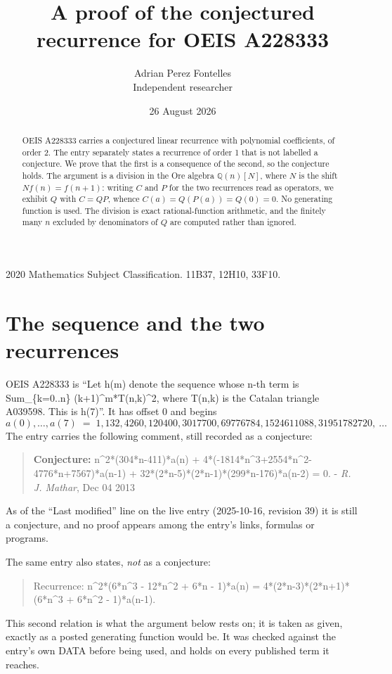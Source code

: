 \documentclass[11pt,a4paper]{article}
\title{A proof of the conjectured recurrence for OEIS A228333}
\author{Adrian Perez Fontelles\\ \small Independent researcher}
\date{26 August 2026}
\theoremstyle{plain}
\theoremstyle{definition}
\begin{document}
\maketitle

\begin{abstract}
OEIS A228333 carries a conjectured linear recurrence with polynomial coefficients, of
order 2. The entry separately states a recurrence of order 1 that is not
labelled a conjecture. We prove that the first is a consequence of the second, so the
conjecture holds. The argument is a division in the Ore algebra
$\mathbb{Q}(n)[N]$, where $N$ is the shift $Nf(n)=f(n+1)$: writing $C$ and $P$ for the two
recurrences read as operators, we exhibit $Q$ with $C=QP$, whence
$C(a)=Q(P(a))=Q(0)=0$. No generating function is used. The division is exact
rational-function arithmetic, and the finitely many $n$ excluded by denominators of $Q$
are computed rather than ignored.
\end{abstract}

\noindent\small 2020 Mathematics Subject Classification. 11B37, 12H10, 33F10.\normalsize

\section{The sequence and the two recurrences}

OEIS A228333 is ``Let h(m) denote the sequence whose n-th term is Sum\_\{k=0..n\} (k+1)\^{}m*T(n,k)\^{}2, where T(n,k) is the Catalan triangle A039598. This is h(7)''. It has offset $0$ and begins
\[
a(0),\dots,a(7)\;=\;1, 132, 4260, 120400, 3017700, 69776784, 1524611088, 31951782720,\ \dots
\]
The entry carries the following comment, still recorded as a conjecture:
\begin{quote}\small
\textbf{Conjecture:} n\^{}2*(304*n-411)*a(n) + 4*(-1814*n\^{}3+2554*n\^{}2-4776*n+7567)*a(n-1) + 32*(2*n-5)*(2*n-1)*(299*n-176)*a(n-2) = 0. - \emph{R. J. Mathar}, Dec 04 2013
\end{quote}
As of the ``Last modified'' line on the live entry (2025-10-16, revision 39) it is still
a conjecture, and no proof appears among the entry's links, formulas or programs.

The same entry also states, \emph{not} as a conjecture:
\begin{quote}\small
Recurrence: n\^{}2*(6*n\^{}3 - 12*n\^{}2 + 6*n - 1)*a(n) = 4*(2*n-3)*(2*n+1)*(6*n\^{}3 + 6*n\^{}2 - 1)*a(n-1).
\end{quote}
This second relation is what the argument below rests on; it is taken as given, exactly as
a posted generating function would be. It was checked against the entry's own DATA before
being used, and holds on every published term it reaches.
\end{document}
